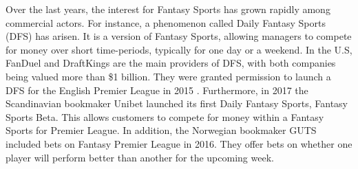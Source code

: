 \newpar

Over the last years, the interest for Fantasy Sports has grown rapidly among commercial actors. For instance, a phenomenon called Daily Fantasy Sports (DFS) has arisen. It is a version of Fantasy Sports, allowing managers to compete for money over short time-periods, typically for one day or a weekend. In the U.S, FanDuel and DraftKings are the main providers of DFS, with both companies being valued more than \$1 billion. They were granted permission to launch a DFS for the English Premier League in 2015 \citep{Purdum}. Furthermore, in 2017 the Scandinavian bookmaker Unibet launched its first Daily Fantasy Sports, Fantasy Sports Beta. This allows customers to compete for money within a Fantasy Sports for Premier League. In addition, the Norwegian bookmaker GUTS included bets on Fantasy Premier League in 2016. They offer bets on whether one player will perform better than another for the upcoming week.
\newpar

\begin{comment}
Although Daily Fantasy Sports are primarily available for American leagues, FanDuel and DraftKings were granted permission to launch a DFS for the English Premier League in 2015 \citep{Purdum}. However, DFS is yet to break through in Europe. With the great interest of the English Premier League, and the amount of active FPL managers, a question has arisen of why this is the case. The answer may lie in the difference in gambling rules in the US and in Europe. While sports gambling is illegal in most of the states in the US, sports gambling has been a tradition in Europe for several years. Hence, European gamblers might not consider Daily Fantasy Sports as a substitute for regular sports gambling.

\newpar

For the past years, there has been a lack of European bookmakers providing gambling for Fantasy Sports. In 2017 however, the Scandinavian bookmaker Unibet launched its first Daily Fantasy Sports, Fantasy Sports Beta. This allows customers to compete for money within a Fantasy Sports for Premier League. In addition, the Norwegian bookmaker GUTS included bets on Fantasy Premier League in 2016. For instance, one may bet on whether one player will perform better than another for the upcoming week. Additionally, one can bet on which of the top rated players will perform best for the upcoming gameweek. As a result of Fantasy Premier League becoming more popular over years and European bookmakers providing odds for the game, it seems like Fantasy Sports can experience a growth in Europe as well. 
\end{comment}


